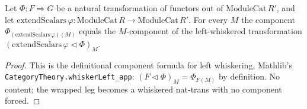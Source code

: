 \begin{lemma}
  \label{lem:ring_square_glue_whiskerLeft_lift}
  Let \(\Phi : F \Rightarrow G\) be a natural transformation of functors out of
  \(\mathrm{ModuleCat}\,R'\), and let \(\mathrm{extendScalars}\,\varphi : \mathrm{ModuleCat}\,R \to
  \mathrm{ModuleCat}\,R'\). For every \(M\) the component
  \(\Phi_{(\mathrm{extendScalars}\,\varphi)(M)}\) equals the \(M\)-component of the left-whiskered
  transformation \((\mathrm{extendScalars}\,\varphi \lhd \Phi)_M\).
  \begin{proof}
    This is the definitional component formula for left whiskering, Mathlib's
    \texttt{CategoryTheory.whiskerLeft\_app}: \((F \lhd \Phi)_M = \Phi_{F(M)}\) by definition. No
    content; the wrapped leg becomes a whiskered nat-trans with no component forced.
  \end{proof}
\end{lemma}

